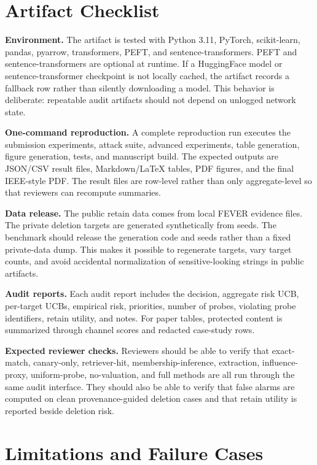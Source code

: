 \section{Artifact Checklist}

\textbf{Environment.}
The artifact is tested with Python 3.11, PyTorch, scikit-learn, pandas, pyarrow, transformers, PEFT, and sentence-transformers. PEFT and sentence-transformers are optional at runtime. If a HuggingFace model or sentence-transformer checkpoint is not locally cached, the artifact records a fallback row rather than silently downloading a model. This behavior is deliberate: repeatable audit artifacts should not depend on unlogged network state.

\textbf{One-command reproduction.}
A complete reproduction run executes the submission experiments, attack suite, advanced experiments, table generation, figure generation, tests, and manuscript build. The expected outputs are JSON/CSV result files, Markdown/LaTeX tables, PDF figures, and the final IEEE-style PDF. The result files are row-level rather than only aggregate-level so that reviewers can recompute summaries.

\textbf{Data release.}
The public retain data comes from local FEVER evidence files. The private deletion targets are generated synthetically from seeds. The benchmark should release the generation code and seeds rather than a fixed private-data dump. This makes it possible to regenerate targets, vary target counts, and avoid accidental normalization of sensitive-looking strings in public artifacts.

\textbf{Audit reports.}
Each audit report includes the decision, aggregate risk UCB, per-target UCBs, empirical risk, priorities, number of probes, violating probe identifiers, retain utility, and notes. For paper tables, protected content is summarized through channel scores and redacted case-study rows.

\textbf{Expected reviewer checks.}
Reviewers should be able to verify that exact-match, canary-only, retriever-hit, membership-inference, extraction, influence-proxy, uniform-probe, no-valuation, and full \method{} methods are all run through the same audit interface. They should also be able to verify that false alarms are computed on clean provenance-guided deletion cases and that retain utility is reported beside deletion risk.

\section{Limitations and Failure Cases}

